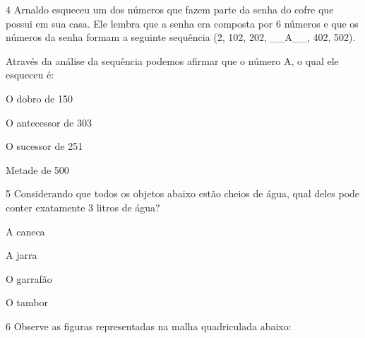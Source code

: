 \num{4} Arnaldo esqueceu um dos números que fazem parte da senha do cofre
que possui em sua casa. Ele lembra que a senha era composta por 6
números e que os números da senha formam a seguinte sequência (2, 102,
202, \_\_A\_\_, 402, 502).

Através da análise da sequência podemos afirmar que o número A, o qual
ele esqueceu é:

\begin{escolha}
\item
  O dobro de 150
\item
  O antecessor de 303
\item
  O sucessor de 251
\item
  Metade de 500
\end{escolha}


\num{5} Considerando que todos os objetos abaixo estão cheios de água, qual
deles pode conter exatamente 3 litros de água?


\begin{escolha}
\item
  A caneca
\item
  A jarra
\item
  O garrafão
\item
  O tambor
\end{escolha}


\num{6} Observe as figuras representadas na malha quadriculada abaixo:


